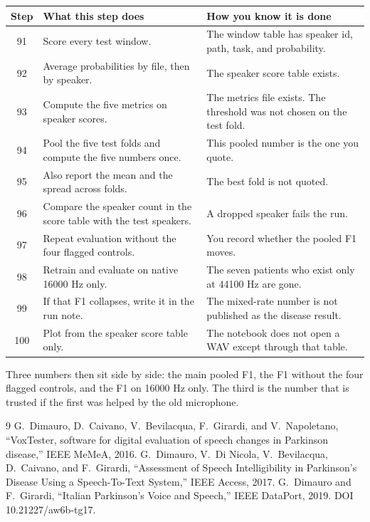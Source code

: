 \documentclass[11pt]{article}
\begin{document}
\begin{longtable}{cp{6.4cm}p{6.4cm}}
\toprule
Step & What this step does & How you know it is done \\
\midrule
\endhead
91 & Score every test window. & The window table has speaker id, path, task, and probability. \\
92 & Average probabilities by file, then by speaker. & The speaker score table exists. \\
93 & Compute the five metrics on speaker scores. & The metrics file exists. The threshold was not chosen on the test fold. \\
94 & Pool the five test folds and compute the five numbers once. & This pooled number is the one you quote. \\
95 & Also report the mean and the spread across folds. & The best fold is not quoted. \\
96 & Compare the speaker count in the score table with the test speakers. & A dropped speaker fails the run. \\
97 & Repeat evaluation without the four flagged controls. & You record whether the pooled F1 moves. \\
98 & Retrain and evaluate on native 16000 Hz only. & The seven patients who exist only at 44100 Hz are gone. \\
99 & If that F1 collapses, write it in the run note. & The mixed-rate number is not published as the disease result. \\
100 & Plot from the speaker score table only. & The notebook does not open a WAV except through that table. \\
\bottomrule
\end{longtable}

Three numbers then sit side by side: the main pooled F1, the F1 without the four flagged controls, and the F1 on 16000 Hz only. The third is the number that is trusted if the first was helped by the old microphone.

\begin{thebibliography}{9}
 G.~Dimauro, D.~Caivano, V.~Bevilacqua, F.~Girardi, and V.~Napoletano, ``VoxTester, software for digital evaluation of speech changes in Parkinson disease,'' IEEE MeMeA, 2016.
 G.~Dimauro, V.~Di Nicola, V.~Bevilacqua, D.~Caivano, and F.~Girardi, ``Assessment of Speech Intelligibility in Parkinson's Disease Using a Speech-To-Text System,'' IEEE Access, 2017.
 G.~Dimauro and F.~Girardi, ``Italian Parkinson's Voice and Speech,'' IEEE DataPort, 2019. DOI 10.21227/aw6b-tg17.
\end{thebibliography}
\end{document}
